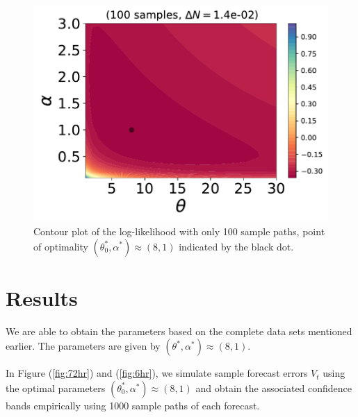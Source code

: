 \documentclass[10pt,twocolumn,letterpaper]{article}
\begin{document}
 \begin{figure}[t]
\begin{center}
   \includegraphics[width=0.9\linewidth]{ISO_100_samples_dN=14e-02.pdf}
\end{center}
   \caption{Contour plot of the log-likelihood with only 100 sample paths, point of optimality $(\theta_0^*, \alpha^*)\approx (8,1)$ indicated by the  black dot.}
\label{contour}
\end{figure}









\section{Results}
 We are able to obtain the parameters based on the complete data sets mentioned earlier. The parameters are given by $(\theta^*, \alpha^*)\approx (8,1)$.



In Figure (\ref{fig:72hr}) and (\ref{fig:6hr}), we simulate sample forecast errors $V_t$ using the optimal parameters  $(\theta_0^*, \alpha^*)\approx (8,1)$ and obtain the associated confidence bands empirically using 1000 sample paths of each forecast. %
\end{document}
